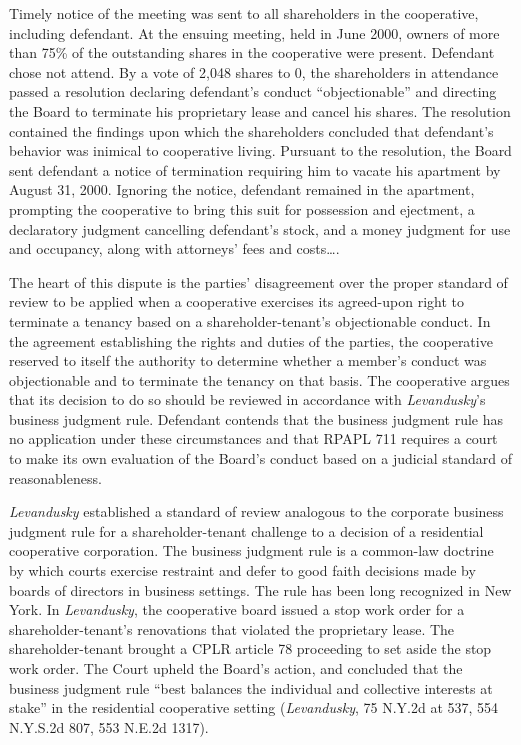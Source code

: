 Timely notice of the meeting was sent to all shareholders in the cooperative,
including defendant. At the ensuing meeting, held in June 2000, owners of more
than 75\% of the outstanding shares in the cooperative were present. Defendant
chose not attend. By a vote of 2,048 shares to 0, the shareholders in attendance
passed a resolution declaring defendant's conduct ``objectionable'' and
directing the Board to terminate his proprietary lease and cancel his shares.
The resolution contained the findings upon which the shareholders concluded that
defendant's behavior was inimical to cooperative living. Pursuant to the
resolution, the Board sent defendant a notice of termination requiring him to
vacate his apartment by August 31, 2000. Ignoring the notice, defendant remained
in the apartment, prompting the cooperative to bring this suit for possession
and ejectment, a declaratory judgment cancelling defendant's stock, and a money
judgment for use and occupancy, along with attorneys' fees and costs\ldots .



The heart of this dispute is the parties' disagreement over the proper standard
of review to be applied when a cooperative exercises its agreed-upon right to
terminate a tenancy based on a shareholder-tenant's objectionable conduct. In
the agreement establishing the rights and duties of the parties, the cooperative
reserved to itself the authority to determine whether a member's conduct was
objectionable and to terminate the tenancy on that basis. The cooperative argues
that its decision to do so should be reviewed in accordance with
\textit{Levandusky}'s business judgment rule. Defendant contends that the
business judgment rule has no application under these circumstances and that
RPAPL 711 requires a court to make its own evaluation of the Board's conduct
based on a judicial standard of reasonableness.

\textit{Levandusky} established a standard of review analogous to the corporate
business judgment rule for a shareholder-tenant challenge to a decision of a
residential cooperative corporation. The business judgment rule is a common-law
doctrine by which courts exercise restraint and defer to good faith decisions
made by boards of directors in business settings. The rule has been long
recognized in New York. In \textit{Levandusky}, the cooperative board issued a
stop work order for a shareholder-tenant's renovations that violated the
proprietary lease. The shareholder-tenant brought a CPLR article 78 proceeding
to set aside the stop work order. The Court upheld the Board's action, and
concluded that the business judgment rule ``best balances the individual and
collective interests at stake'' in the residential cooperative setting
(\textit{Levandusky}, 75 N.Y.2d at 537, 554 N.Y.S.2d 807, 553 N.E.2d 1317).

